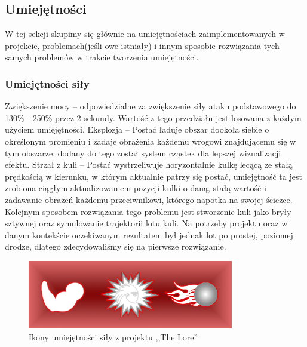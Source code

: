 \documentclass[oneside,polski,logo]{amuthesis}
\begin{document}
\subsection{Umiejętności}
W tej sekcji skupimy się głównie na umiejętnościach zaimplementowanych w projekcie, problemach(jeśli owe istniały) i innym sposobie rozwiązania tych samych problemów w trakcie tworzenia umiejętności.
\subsubsection{Umiejętności siły}
Zwiększenie mocy – odpowiedzialne za zwiększenie siły ataku podstawowego do 130\% - 250\% przez 2 sekundy. Wartość z tego przedziału jest losowana z każdym użyciem umiejętności.
Eksplozja – Postać ładuje obszar dookoła siebie o określonym promieniu i zadaje obrażenia każdemu wrogowi znajdującemu się w tym obszarze, dodany do tego został system cząstek dla lepszej wizualizacji efektu.
Strzał z kuli – Postać wystrzeliwuje horyzontalnie kulkę lecącą ze stałą prędkością w kierunku, w którym aktualnie patrzy się postać, umiejętność ta jest zrobiona ciągłym aktualizowaniem pozycji kulki o daną, stałą wartość i zadawanie obrażeń każdemu przeciwnikowi, którego napotka na swojej ścieżce. Kolejnym sposobem rozwiązania tego problemu jest stworzenie kuli jako bryły sztywnej oraz symulowanie trajektorii lotu kuli. Na potrzeby projektu oraz w danym kontekście oczekiwanym rezultatem był jednak lot po prostej, poziomej drodze, dlatego zdecydowaliśmy się na pierwsze rozwiązanie.
\begin{figure}[h]
	\centering
	\includegraphics[width=9cm]{images/kozubal/sila.png}
	\caption{Ikony umiejętności siły z projektu ,,The Lore''}
\end{figure}
\end{document}
